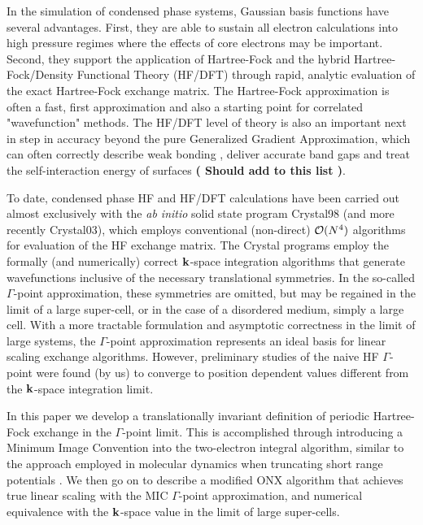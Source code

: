 \documentclass[prb,aps,nobibnotes,twocolumn,doublespace,twocolumngrid,superbib]{revtex4}
\begin{document}
In the simulation of condensed phase systems, Gaussian basis functions have several 
advantages.  First, they are able to sustain all electron calculations into high 
pressure regimes where the effects of core electrons may be important. Second, they
support the application of Hartree-Fock and the hybrid Hartree-Fock/Density Functional 
Theory (HF/DFT) \cite{Gill92,Becke93,VBarone96,CAdamo99} through rapid, 
analytic evaluation of the exact Hartree-Fock exchange matrix.  
The Hartree-Fock approximation is often a fast, first approximation and also a starting point 
for correlated "wavefunction" methods.  The HF/DFT level of theory is also an important next 
in step in accuracy beyond the pure Generalized Gradient Approximation, which can often correctly 
describe  weak bonding \cite{}, deliver accurate band gaps \cite{} and treat the self-interaction 
energy of surfaces \cite{} {\bf( Should add to this list )}.  

To date, condensed phase HF and HF/DFT calculations have been carried out almost 
exclusively with the {\em ab initio} solid state program {\sc Crystal98} \cite{} (and
more recently {\sc Crystal03}), which employs conventional (non-direct) ${\cal O}(N^4)$ 
algorithms for evaluation of the HF exchange matrix.  The {\sc Crystal} programs employ the
formally (and numerically) correct ${\bf k}$-space integration algorithms that generate 
wavefunctions  inclusive of the necessary translational symmetries.   In the so-called $\Gamma$-point
approximation,  these symmetries are omitted, but may be regained in the limit of a large
super-cell,  or in the case of a disordered medium, simply a large cell.  With a more
tractable  formulation and asymptotic correctness in the limit of large systems, the
$\Gamma$-point  approximation represents an ideal basis for linear scaling exchange 
algorithms.   However, preliminary studies of the naive HF $\Gamma$-point were found (by us)
to converge to position dependent values different from the ${\bf k}$-space integration 
limit.   

In this paper we develop a translationally invariant definition of periodic Hartree-Fock exchange 
in the $\Gamma$-point limit.  This is accomplished through introducing a Minimum Image Convention
into the two-electron integral algorithm, similar to the approach employed in molecular dynamics when 
truncating short range potentials \cite{}.  We then go on to describe a modified {\sc ONX} 
algorithm \cite{} that achieves true linear scaling with the MIC $\Gamma$-point approximation, and 
numerical equivalence with the ${\bf k}$-space value in the limit of large super-cells.
\end{document}

